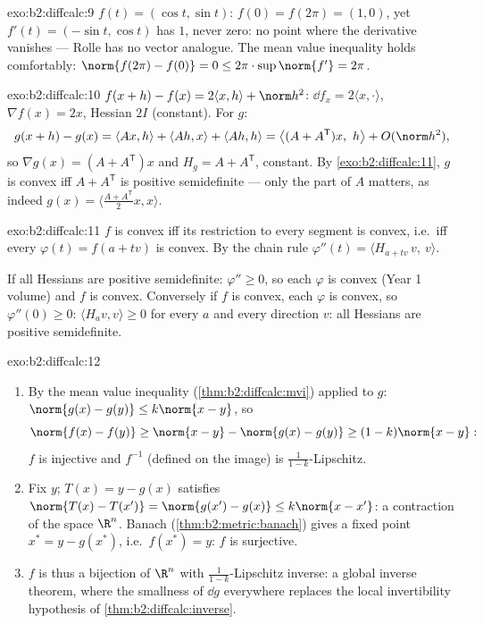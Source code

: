 \begin{solution}{exo:b2:diffcalc:9}
$f(t) = (\cos t, \sin t)$: $f(0) = f(2\pi) = (1, 0)$, yet $f'(t) =
(-\sin t, \cos t)$ has  $1$, never zero: no point where the
derivative vanishes --- Rolle has no vector analogue. The mean
value inequality holds comfortably: $\norm{f(2\pi) - f(0)} = 0 \leq
2\pi \cdot \sup\norm{f'} = 2\pi$.
\end{solution}

\begin{solution}{exo:b2:diffcalc:10}
$f(x+h) - f(x) = 2\langle x, h\rangle + \norm h^2$: $\dd f_x =
2\langle x, \cdot\rangle$, $\nabla f(x) = 2x$, Hessian $2I$
(constant). For $g$:
\[
g(x + h) - g(x) = \langle Ax, h\rangle + \langle Ah, x\rangle
+ \langle Ah, h\rangle
= \bigl\langle (A + A^{\mathsf T})x,\ h\bigr\rangle +
O(\norm h^2),
\]
so $\nabla g(x) = (A + A^{\mathsf T})x$ and $H_g = A +
A^{\mathsf T}$, constant. By \cref{exo:b2:diffcalc:11}, $g$ is
convex iff $A + A^{\mathsf T}$ is positive semidefinite ---
only the  part of $A$ matters, as indeed $g(x) =
\langle \frac{A + A^{\mathsf T}}2 x, x\rangle$.
\end{solution}

\begin{solution}{exo:b2:diffcalc:11}
$f$ is convex iff its restriction to every segment is convex,
i.e.\ iff every $\varphi(t) = f(a + tv)$ is convex. By the chain
rule $\varphi''(t) = \langle H_{a+tv}\,v,\ v\rangle$.

If all Hessians are positive semidefinite: $\varphi'' \geq 0$,
so each $\varphi$ is convex (Year 1 volume) and $f$ is convex.
Conversely if $f$ is convex, each $\varphi$ is convex, so
$\varphi''(0) \geq 0$: $\langle H_a v, v\rangle \geq 0$ for
every $a$ and every direction $v$: all Hessians are positive
semidefinite.
\end{solution}

\begin{solution}{exo:b2:diffcalc:12}
\begin{enumerate}
  \item By the mean value inequality
        (\cref{thm:b2:diffcalc:mvi}) applied to $g$:
        $\norm{g(x) - g(y)} \leq k\norm{x-y}$, so
        \[
        \norm{f(x) - f(y)} \geq \norm{x - y} - \norm{g(x) -
        g(y)} \geq (1 - k)\norm{x - y} :
        \]
        $f$ is injective and $f^{-1}$ (defined on the image) is
        $\frac{1}{1-k}$-Lipschitz.
  \item Fix $y$; $T(x) = y - g(x)$ satisfies $\norm{T(x) -
        T(x')} = \norm{g(x') - g(x)} \leq k\norm{x - x'}$: a
        contraction of the  space $\R^n$. Banach
        (\cref{thm:b2:metric:banach}) gives a fixed point $x^*
        = y - g(x^*)$, i.e.\ $f(x^*) = y$: $f$ is surjective.
  \item $f$ is thus a bijection of $\R^n$ with
        $\frac{1}{1-k}$-Lipschitz inverse: a global inverse
        theorem, where the smallness of $\dd g$ everywhere
        replaces the local invertibility hypothesis of
        \cref{thm:b2:diffcalc:inverse}.
\end{enumerate}
\end{solution}

